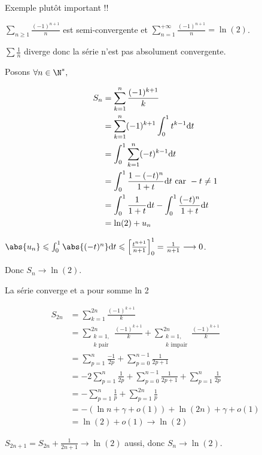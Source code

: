 \begin{exemple}
    Exemple plutôt important !!

    $\displaystyle \sum_{n \geqslant 1 } \frac{(-1)^{n + 1}} n $ est semi-convergente et $\displaystyle \sum_{n = 1 }^{+ \infty} \frac{(-1)^{n + 1}} n = \ln(2)$.

    $\sum \frac 1 n$ diverge donc la série n'est pas absolument convergente. 

    Posons $\forall n \in \N^*, $

    \begin{align*}
        S_n & = \sum_{k = 1}^{n} \frac{(-1)^{k + 1}} k \\
        & = \sum_{k = 1 }^{n } (-1)^{k + 1} \int_0^1 t^{k - 1} \text d t \\
        & = \int_0^1 \sum_{k = 1 }^{n } (-t)^{k - 1} \text d t \\
        & = \int_0^1 \frac{1 - (-t)^n}{1 + t} \text d t \text{ car } -t \neq 1\\
        & = \int_0^1 \frac 1 {1 + t} \text d t - \int_0^1 \frac{(-t)^n}{1 + t} \text d t \\
        & = \ln(2) + u_n
    \end{align*}

    $\abs{u_n} \leqslant \int_0^1 \abs{(-t)^n} \text d t \leqslant \left[ \frac{t^{n + 1 }}{n + 1} \right]_0^1 = \frac 1 {n + 1} \longrightarrow 0$.

    Donc $S_n \longrightarrow \ln(2)$.

    La série converge et a pour somme ln 2


    \begin{align*}
        S_{2n} & = \sum_{k = 1}^{2n} \frac{(-1)^{k + 1}} k \\
                & = \sum_{\substack {k = 1, \\ k \text{ pair}}}^{2n} \frac {(-1)^{k + 1}} k + \sum_{\substack{k = 1, \\ k \text{ impair}}}^{2n} \frac {(-1)^{k + 1}} k \\
                & = \sum_{p = 1}^{n} \frac{-1}{2p} + \sum_{p = 0}^{n - 1} \frac{1}{2p + 1} \\
                & = -2 \sum_{p = 1 }^{n } \frac 1 {2p} + \sum_{p = 0}^{n - 1} \frac 1 {2 p + 1} + \sum_{p = 1}^{n} \frac 1 {2p} \\
                & = - \sum_{p = 1 }^{n } \frac 1 p + \sum_{p = 1}^{2n} \frac 1 p \\
                & = - (\ln n + \gamma + o (1)) + \ln (2n) + \gamma + o(1) \\
                & = \ln(2) + o(1) \longrightarrow \ln(2)
    \end{align*}

    $S_{2n + 1} = S_{2n} + \frac{1}{2n + 1} \longrightarrow \ln(2)$ aussi, donc $S_n \longrightarrow \ln(2)$.
\end{exemple}

